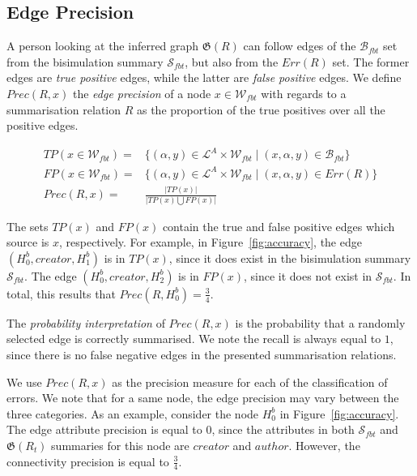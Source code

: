 \subsection{Edge Precision}
\label{sec:edge-precision}

A person looking at the inferred graph $\mathfrak{G}(R)$ can follow edges of the $\mathcal{B}_{fbt}$ set from the bisimulation summary $\mathcal{S}_{fbt}$, but also from the $Err(R)$ set. The former edges are \emph{true positive} edges, while the latter are \emph{false positive} edges. We define $Prec(R, x)$ the \emph{edge precision} of a node $x \in \mathcal{W}_{fbt}$ with regards to a summarisation relation $R$ as the proportion of the true positives over all the positive edges.

$$
\begin{aligned}
TP(x \in \mathcal{W}_{fbt}) = & \{ (\alpha, y) \in \mathcal{L}^A \times \mathcal{W}_{fbt} \mid (x, \alpha, y) \in \mathcal{B}_{fbt} \} \\
FP(x \in \mathcal{W}_{fbt}) = & \{ (\alpha, y) \in \mathcal{L}^A \times \mathcal{W}_{fbt} \mid (x, \alpha, y) \in Err(R) \} \\
Prec(R, x) = & \frac{\vert TP(x) \vert}{\vert TP(x) \bigcup FP(x) \vert}
\end{aligned}
$$

The sets $TP(x)$ and $FP(x)$ contain the true and false positive edges which source is $x$, respectively. For example, in Figure~\ref{fig:accuracy}, the edge $(H^b_0, creator, H^b_1)$ is in $TP(x)$, since it does exist in the bisimulation summary $\mathcal{S}_{fbt}$. The edge $(H^b_0, creator, H^b_2)$ is in $FP(x)$, since it does not exist in $\mathcal{S}_{fbt}$. In total, this results that $Prec\left(R, H^b_0\right) = \frac{3}{4}$.

The \emph{probability interpretation} of $Prec(R, x)$ is the probability that a randomly selected edge is correctly summarised. We note the recall is always equal to $1$, since there is no false negative edges in the presented summarisation relations.

We use $Prec(R, x)$ as the precision measure for each of the classification of errors. We note that for a same node, the edge precision may vary between the three categories. As an example, consider the node $H^b_0$ in Figure~\ref{fig:accuracy}. The edge attribute precision is equal to $0$, since the attributes in both $\mathcal{S}_{fbt}$ and $\mathfrak{G}(R_t)$ summaries for this node are $creator$ and $author$. However, the connectivity precision is equal to $\frac{3}{4}$.
